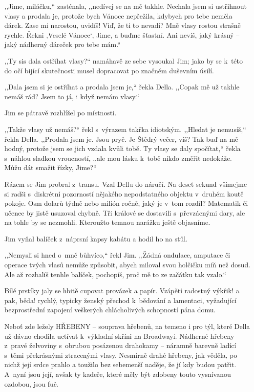 ,,Jime, miláčku,`` zasténala, ,,nedívej se na mě takhle. Nechala jsem si ustřihnout vlasy a prodala je, protože bych Vánoce nepřežila, kdybych pro tebe neměla dárek. Zase mi narostou, uvidíš! Viď, že ti to nevadí? Mně vlasy rostou strašně rychle. Řekni ,Veselé Vánoce‘, Jime, a buďme šťastní. Ani nevíš, jaký krásný -- jaký nádherný dáreček pro tebe mám.``

,,Ty sis dala ostříhat vlasy?`` namáhavě ze sebe vysoukal Jim; jako by se k této do očí bijící skutečnosti musel dopracovat po značném duševním úsilí.

,,Dala jsem si je ostříhat a prodala jsem je,`` řekla Della. ,,Copak mě už takhle nemáš rád? Jsem to já, i když nemám vlasy.``

Jim se pátravě rozhlížel po místnosti.

,,Takže vlasy už nemáš?`` řekl s výrazem takřka idiotským. ,,Hledat je nemusíš,`` řekla Della. ,,Prodala jsem je. Jsou pryč. Je Štědrý večer, víš? Tak buď na mě hodný, protože jsem se jich vzdala kvůli tobě. Ty vlasy se daly spočítat,`` řekla s náhlou sladkou vroucností, ,,ale mou lásku k tobě nikdo změřit nedokáže. Můžu dát smažit řízky, Jime?``

Rázem se Jim probral z transu. Vzal Dellu do náručí. Na deset sekund všímejme si radši s diskrétní pozorností nějakého nepodstatného objektu v druhém koutě pokoje. Osm dolarů týdně nebo milión ročně, jaký je v tom rozdíl? Matematik či učenec by jistě usuzoval chybně. Tři králové se dostavili s převzácnými dary, ale na tohle by se nezmohli. Kteroužto temnou narážku ještě objasníme.

Jim vyňal balíček z náprsní kapsy kabátu a hodil ho na stůl.

,,Nemysli si hned o~mně bůhvíco,`` řekl Jim. ,,Žádná ondulace, amputace či operace tvých vlasů nemůže způsobit, abych miloval svou holčičku míň než dosud. Ale až rozbalíš tenhle balíček, pochopíš, proč mě to ze začátku tak vzalo.``

Bílé prstíky jaly se hbitě cupovat provázek a papír. Vzápětí radostný výkřik! a pak, běda! rychlý, typicky ženský přechod k bědování a lamentaci, vyžadující bezprostřední zapojení veškerých chlácholivých schopností pána domu.

Neboť zde ležely HŘEBENY -- souprava hřebenů, na temeno i pro týl, které Della už dávno chodila uctívat k výkladní skříni na Broadwayi. Nádherné hřebeny z pravé želvoviny s obrubou posázenou drahokamy -- náramně barevně ladící s těmi překrásnými ztracenými vlasy. Nesmírně drahé hřebeny, jak věděla, po nichž její srdce prahlo a toužilo bez sebemenší naděje, že jí kdy budou patřit. A~nyní jsou její, avšak ty kadeře, které měly být zdobeny touto vysnívanou ozdobou, jsou fuč.

